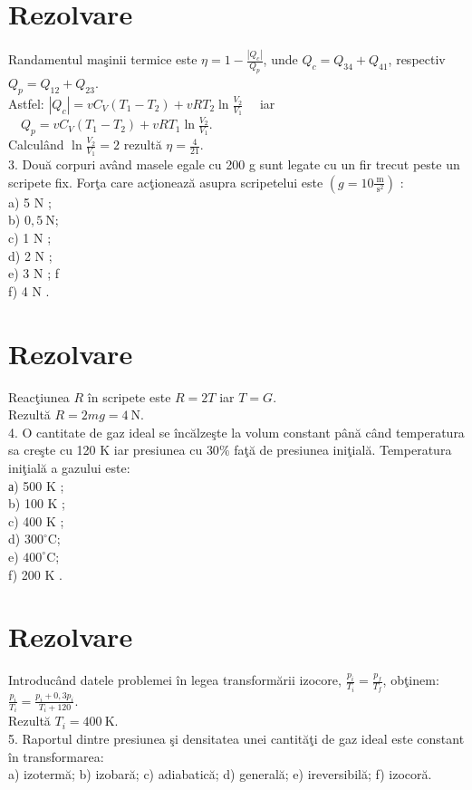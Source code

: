 \section*{Rezolvare}
Randamentul maşinii termice este $\eta=1-\frac{\left|Q_{c}\right|}{Q_{p}}$, unde $Q_{c}=Q_{34}+Q_{41}$, respectiv $Q_{p}=Q_{12}+Q_{23}$.\\
Astfel: $\left|Q_{c}\right|=v C_{V}\left(T_{1}-T_{2}\right)+v R T_{2} \ln \frac{V_{2}}{V_{1}} \quad$ iar $\quad Q_{p}=v C_{V}\left(T_{1}-T_{2}\right)+v R T_{1} \ln \frac{V_{2}}{V_{1}}$.\\
Calculând $\ln \frac{V_{2}}{V_{1}}=2$ rezultă $\eta=\frac{4}{21}$.\\
3. Două corpuri având masele egale cu 200 g sunt legate cu un fir trecut peste un scripete fix. Forţa care acţionează asupra scripetelui este $\left(g=10 \frac{\mathrm{~m}}{\mathrm{~s}^{2}}\right)$ :\\
a) 5 N ;\\
b) $0,5 \mathrm{~N}$;\\
c) 1 N ;\\
d) 2 N ;\\
e) 3 N ; f\\
f) 4 N .

\section*{Rezolvare}
Reacţiunea $R$ în scripete este $R=2 T$ iar $T=G$.\\
Rezultă $R=2 m g=4 \mathrm{~N}$.\\
4. O cantitate de gaz ideal se încălzeşte la volum constant până când temperatura sa creşte cu 120 K iar presiunea cu $30 \%$ faţă de presiunea iniţială. Temperatura iniţială a gazului este:\\
а) 500 K ;\\
b) 100 K ;\\
c) 400 K ;\\
d) $300^{\circ} \mathrm{C}$;\\
e) $400^{\circ} \mathrm{C}$;\\
f) 200 K .

\section*{Rezolvare}
Introducând datele problemei în legea transformării izocore, $\frac{p_{i}}{T_{i}}=\frac{p_{f}}{T_{f}}$, obţinem: $\frac{p_{i}}{T_{i}}=\frac{p_{i}+0,3 p_{i}}{T_{i}+120}$.\\
Rezultă $T_{i}=400 \mathrm{~K}$.\\
5. Raportul dintre presiunea şi densitatea unei cantităţi de gaz ideal este constant în transformarea:\\
a) izotermă; b) izobară; c) adiabatică; d) generală; e) ireversibilă; f) izocoră.

